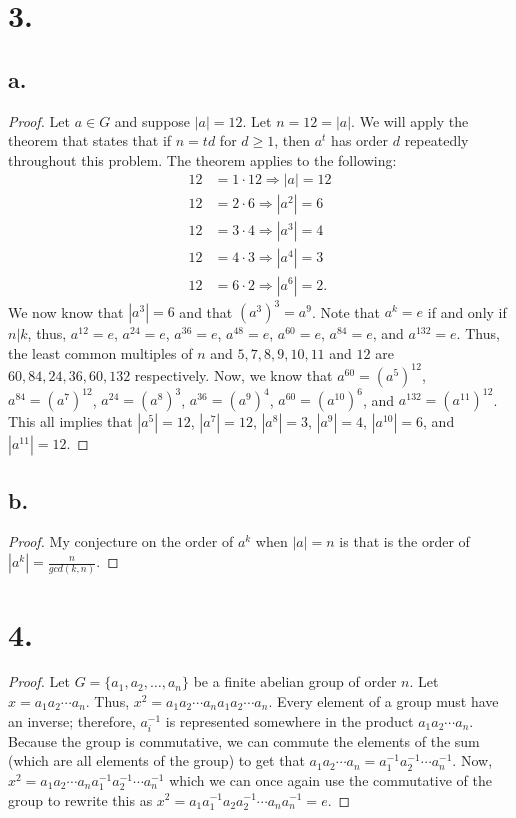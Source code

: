 \documentclass{article}
\begin{document}
\section*{3.}
\subsection*{a.}
\begin{proof}
 Let $a \in G$ and suppose $|a| = 12$. Let $n = 12 = |a|$. We will apply the theorem that states that if $n = td$ for $d \geq 1$, then $a^t$ has order $d$ repeatedly throughout this problem. The theorem applies to the following:
 \begin{align*}
  12 &= 1 \cdot 12 \Rightarrow |a| = 12 \\
  12 &= 2 \cdot 6 \Rightarrow |a^2| = 6 \\
  12 &= 3 \cdot 4 \Rightarrow |a^3| = 4 \\
  12 &= 4 \cdot 3 \Rightarrow |a^4| = 3 \\
  12 &= 6 \cdot 2 \Rightarrow |a^6| = 2.
 \end{align*}
We now know that $|a^3| = 6$ and that $(a^3)^3 = a^9$. Note that $a^k = e$ if and only if $n | k$, thus, $a^{12} = e$, $a^{24} = e$, $a^36 = e$, $a^{48} = e$, $a^{60} = e$, $a^{84} = e$, and $a^{132} = e$. Thus, the least common multiples of $n$ and $5, 7, 8, 9, 10, 11$ and $12$ are $60, 84, 24, 36, 60, 132$ respectively. 
Now, we know that $a^{60} = \left(a^5\right)^{12}$, $a^{84} = \left(a^7 \right)^{12}$, $a^{24} = \left(a^8 \right)^3$, $a^{36} = \left(a^9 \right)^4$, $a^{60} = \left(a^{10} \right)^6$, and $a^{132} = \left(a^{11} \right)^{12}$. This all implies that $|a^5| = 12$, $|a^7| = 12$, $|a^8| = 3$, $|a^9| = 4$, $|a^{10}| = 6$, and $|a^{11}| = 12$. 
\end{proof}

\subsection*{b.}
\begin{proof}
  My conjecture on the order of $a^k$ when $|a| = n$ is that is the order of $|a^k| = \frac{n}{gcd(k, n)}$.  
\end{proof}

\section*{4.}

\begin{proof}
Let $G = \{a_1, a_2, \ldots , a_n \}$ be a finite abelian group of order $n$. Let $x = a_1a_2 \cdots a_n$. 
Thus, $x^2 = a_1a_2 \cdots a_n a_1 a_2 \cdots a_n$. Every element of a group must have an inverse; therefore, $a_i^{-1}$ is represented somewhere in the product $a_1 a_2 \cdots a_n$. Because the group is commutative, we can commute the elements of the sum (which are all elements of the group) to get that $a_1a_2 \cdots a_n = a_1^{-1}a_2^{-1} \cdots a_n^{-1}$. 
Now, $x^2 = a_1a_2 \cdots a_n a_1^{-1}a_2^{-1} \cdots a_n^{-1}$ which we can once again use the commutative of the group to rewrite this as $x^2 = a_1a_1^{-1}a_2a_2^{-1} \cdots a_na_n^{-1} = e$. 
\end{proof}
\end{document}

